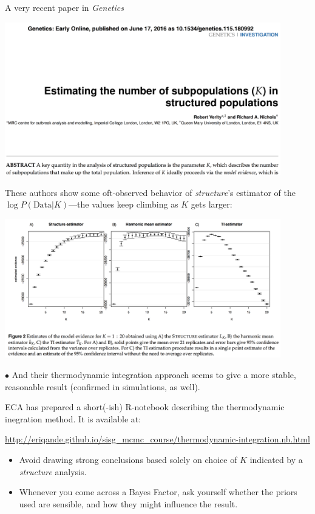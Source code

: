 


A very recent paper in {\em Genetics}
\begin{center}
\includegraphics[width = 0.9\textwidth]{illus/verity.png}
\end{center}
\newpage

These authors show some oft-observed behavior of {\em structure}'s estimator of the $\log P(\mathrm{Data} | K)$---the values keep climbing as $K$ gets larger:
\begin{center}
\includegraphics[width = 0.9\textwidth]{illus/verity2.png}
\end{center}
$\bullet$ And their thermodynamic integration approach seems to give a more stable, reasonable 
result (confirmed in simulations, as well).

\newpage
ECA has prepared a short(-ish) R-notebook describing the thermodynamic inegration method.  It is available at:

{\tiny
\url{http://eriqande.github.io/sisg_mcmc_course/thermodynamic-integration.nb.html}
}


\begin{itemize}
\item Avoid drawing strong conclusions based solely on
choice of $K$ indicated by a {\sl structure} analysis.
\item Whenever you come across a Bayes Factor, ask yourself whether the priors
used are sensible, and how they might influence the result.
\end{itemize}


